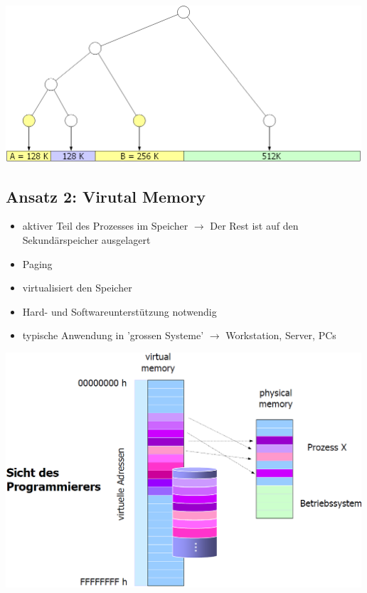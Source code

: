 \documentclass{report}
\newenvironment{Figure}
	{\par\medskip\noindent\minipage{\linewidth}}
	{\endminipage\par\medskip}
\theoremstyle{definition}
\theoremstyle{example}
\begin{document}
\begin{Figure}
\centering
\includegraphics[width=500px]{img/BuddySystemeBinaryTree.png}
	\label{fig:Abbildung eines Buddy System Binärbaums}
\end{Figure}


	\subsection{Ansatz 2: Virutal Memory}
\begin{itemize}
	\item aktiver Teil des Prozesses im Speicher $\rightarrow$ Der Rest ist auf den Sekundärspeicher ausgelagert
	\item Paging
	\item virtualisiert den Speicher 
	\item Hard- und Softwareunterstützung notwendig
	\item typische Anwendung in 'grossen Systeme' $\rightarrow$ Workstation, Server, PCs
\end{itemize}

\begin{Figure}
\centering
\includegraphics[width=500px]{img/VM.png}
	\label{fig:Abbildung von virtual memory}
\end{Figure}
\end{document}

